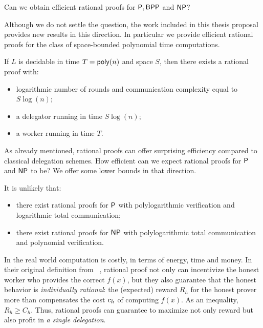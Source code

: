 \begin{question}
	Can we obtain efficient rational proofs for $\P, \BPP$ and $\NP$?
\end{question}

Although we do not settle the question, the work included in this thesis proposal provides new results in this direction.
In particular we provide efficient rational proofs for the class of space-bounded polynomial time computations.

\begin{result}
	\label{ref:space-bounded}
	If $L$ is decidable in time $T = \poly(n)$ and space $S$, then there exists a rational proof with:
	\begin{itemize}
		\item logarithmic number of rounds and communication complexity equal to $S \log(n)$;
		\item a delegator running in time $S \log(n)$;
		\item a worker running in time $T$.
	\end{itemize}
\end{result}

As already mentioned, rational proofs can offer surprising efficiency compared to classical delegation schemes. How efficient can we expect rational proofs for $\P$ and $\NP$ to be? We offer some lower bounds in that direction. 

\begin{result}
	It is unlikely that:
	\begin{itemize}
		\item there exist rational proofs for $\P$ with polylogarithmic verification and logarithmic total communication;
		\item there exist rational proofs for $\NP$ with polylogarithmic total communication and polynomial verification.
	\end{itemize}
\end{result}



In the real world computation is costly, in terms of energy, time and money.
In their original definition from ~\cite{am}, rational proof not only can incentivize the honest worker who provides the correct $f(x)$, but they also guarantee that the honest behavior is \textit{individually rational}: the (expected) reward $R_h$ for the honest prover more than compensates the cost $\cost_h$ of computing $f(x)$. As an inequality, $R_h \geq C_h$. 
Thus, rational proofs can guarantee to maximize not only reward but also profit in \textit{a single delegation}.

